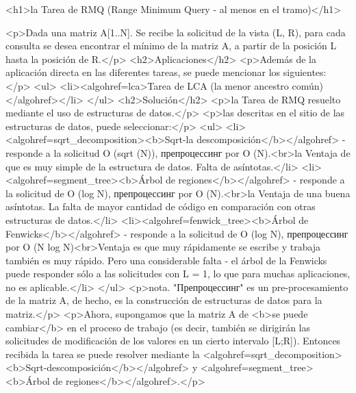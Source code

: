<h1>la Tarea de RMQ (Range Minimum Query - al menos en el tramo)</h1>

<p>Dada una matriz A[1..N]. Se recibe la solicitud de la vista (L, R), para cada consulta se desea encontrar el mínimo de la matriz A, a partir de la posición L hasta la posición de R.</p>
<h2>Aplicaciones</h2>
<p>Además de la aplicación directa en las diferentes tareas, se puede mencionar los siguientes:</p>
<ul>
<li><algohref=lca>Tarea de LCA (la menor ancestro común)</algohref></li>
</ul>
<h2>Solución</h2>
<p>la Tarea de RMQ resuelto mediante el uso de estructuras de datos.</p>
<p>las descritas en el sitio de las estructuras de datos, puede seleccionar:</p>
<ul>
<li><algohref=sqrt_decomposition><b>Sqrt-la descomposición</b></algohref> - responde a la solicitud O (sqrt (N)), препроцессинг por O (N).<br>la Ventaja de que es muy simple de la estructura de datos. Falta de asíntotas.</li>
<li><algohref=segment_tree><b>Árbol de regiones</b></algohref> - responde a la solicitud de O (log N), препроцессинг por O (N).<br>la Ventaja de una buena asíntotas. La falta de mayor cantidad de código en comparación con otras estructuras de datos.</li>
<li><algohref=fenwick_tree><b>Árbol de Fenwicks</b></algohref> - responde a la solicitud de O (log N), препроцессинг por O (N log N)<br>Ventaja es que muy rápidamente se escribe y trabaja también es muy rápido. Pero una considerable falta - el árbol de la Fenwicks puede responder sólo a las solicitudes con L = 1, lo que para muchas aplicaciones, no es aplicable.</li>
</ul>
<p>nota. "Препроцессинг" es un pre-procesamiento de la matriz A, de hecho, es la construcción de estructuras de datos para la matriz.</p>
<p>Ahora, supongamos que la matriz A de <b>se puede cambiar</b> en el proceso de trabajo (es decir, también se dirigirán las solicitudes de modificación de los valores en un cierto intervalo [L;R]). Entonces recibida la tarea se puede resolver mediante la <algohref=sqrt_decomposition><b>Sqrt-descomposición</b></algohref> y <algohref=segment_tree><b>Árbol de regiones</b></algohref>.</p>